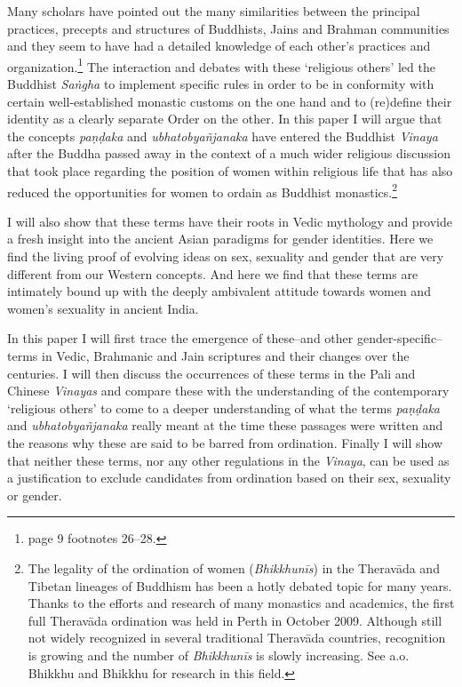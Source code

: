 Many scholars have pointed out the many similarities between the principal practices, precepts and structures of Buddhists, Jains and Brahman communities and they seem to have had a detailed knowledge of each other's practices and organization.\footnote{\cite{maes2016} page 9 footnotes 26–28.} The interaction and debates with these `religious others' led the Buddhist {\em Saṅgha} to implement specific rules in order to be in conformity with certain well-established monastic customs on the one hand and to (re)define their identity as a clearly separate Order on the other. In this paper I will argue that the concepts {\em paṇḍaka} and {\em ubhatob­yañ­janaka} have entered the Buddhist {\em Vinaya} after the Buddha passed away in the context of a much wider religious discussion that took place regarding the position of women within religious life that has also reduced the opportunities for women to ordain as Buddhist monastics.\footnote{The legality of the ordination of women ({\em Bhikkhunīs}) in the Theravāda and Tibetan lineages of Buddhism has been a hotly debated topic for many years. Thanks to the efforts and research of many monastics and academics, the first full Theravāda ordination was held in Perth in October 2009. Although still not widely recognized in several traditional Theravāda countries, recognition is growing and the number of {\em Bhikkhunīs} is slowly increasing. See a.o. Bhikkhu \cite{sujato2009} and Bhikkhu \cite{analayo2013} for research in this field.}

I will also show that these terms have their roots in Vedic mythology and provide a fresh insight into the ancient Asian paradigms for gender identities. Here we find the living proof of evolving ideas on sex, sexuality and gender that are very different from our Western concepts. And here we find that these terms are intimately bound up with the deeply ambivalent attitude towards women and women's sexuality in ancient India.

In this paper I will first trace the emergence of these--and other gender-specific--terms in Vedic, Brahmanic and Jain scriptures and their changes over the centuries. I will then discuss the occurrences of these terms in the Pali and Chinese {\em Vinayas} and compare these with the understanding of the contemporary `religious others' to come to a deeper understanding of what the terms {\em paṇḍaka} and {\em ubhatob­yañ­janaka} really meant at the time these passages were written and the reasons why these are said to be barred from ordination. Finally I will show that neither these terms, nor any other regulations in the {\em Vinaya}, can be used as a justification to exclude candidates from ordination based on their sex, sexuality or gender.
